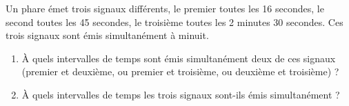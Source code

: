 
Un phare émet trois signaux différents, le premier toutes les 16 secondes, le second toutes les 45 secondes, le troisième toutes les 2 minutes 30 secondes. Ces trois signaux sont émis simultanément à minuit.
\begin{enumerate}
  \item \`A quels intervalles de temps sont émis simultanément deux de ces signaux (premier et deuxième, ou premier et troisième, ou deuxième et troisième) ?
  \item \`A quels intervalles de temps les trois signaux sont-ils émis simultanément ?
\end{enumerate}
